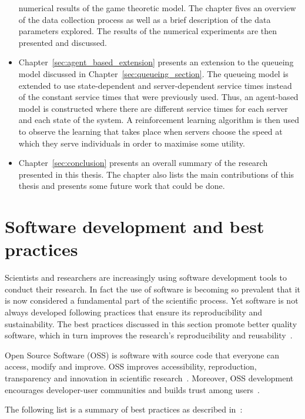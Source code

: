 \begin{itemize}
    numerical results of the game theoretic model.
    The chapter fives an overview of the data collection process as well as a
    brief description of the data parameters explored.
    The results of the numerical experiments are then presented and discussed.
    \item Chapter~\ref{sec:agent_based_extension} presents an extension to the
    queueing model discussed in Chapter~\ref{sec:queueing_section}.
    The queueing model is extended to use state-dependent and server-dependent
    service times instead of the constant service times that were previously
    used.
    Thus, an agent-based model is constructed where there are different service
    times for each server and each state of the system.
    A reinforcement learning algorithm is then used to observe the learning
    that takes place when servers choose the speed at which they serve
    individuals in order to maximise some utility.
    \item Chapter~\ref{sec:conclusion} presents an overall summary of the
    research presented in this thesis.
    The chapter also lists the main contributions of this thesis and presents
    some future work that could be done.
\end{itemize}




\section{Software development and best practices}\label{sec:intro_software}

Scientists and researchers are increasingly using software development tools to
conduct their research.
In fact the use of software is becoming so prevalent that it is now
considered a fundamental part of the scientific process.
Yet software is not always developed following practices that ensure its
reproducibility and sustainability.
The best practices discussed in this section promote better quality software,
which in turn improves the research's reproducibility and
reusability~\cite{jimenez2017four}.

Open Source Software (OSS) is software with source code that everyone can
access, modify and improve.
OSS improves accessibility, reproduction, transparency and innovation in
scientific research~\cite{mulgan2005wide}.
Moreover, OSS development encourages developer-user communities and builds
trust among users~\cite{mckiernan2016open}.

The following list is a summary of best practices as described
in~\cite{wilson2014best}:

